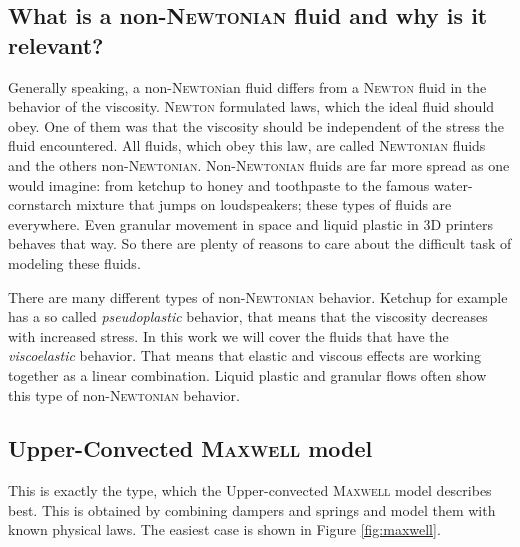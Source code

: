 \documentclass[12pt,a4paper,twoside, open=right]{scrreprt}
\theoremstyle{definition}
\theoremstyle{plain}
\begin{document}
\subsection{What is a non-\textsc{Newtonian} fluid and why is it relevant?}
Generally speaking, a non-\textsc{Newton}ian fluid differs from a \textsc{Newton} fluid in the behavior of the viscosity. \textsc{Newton} formulated laws, which the ideal fluid should obey. One of them was that the viscosity should be independent of the stress the fluid encountered. All fluids, which obey this law, are called \textsc{Newtonian} fluids and the others non-\textsc{Newtonian}. Non-\textsc{Newtonian} fluids are far more spread as one would imagine: from ketchup to honey and toothpaste to the famous water-cornstarch mixture that jumps on loudspeakers; these types of fluids are everywhere. Even granular movement in space and liquid plastic in 3D printers behaves that way. So there are plenty of reasons to care about the difficult task of modeling these fluids. \par 
There are many different types of non-\textsc{Newtonian} behavior. Ketchup for example has a so called \emph{pseudoplastic} behavior, that means that the viscosity decreases with increased stress. In this work we will cover the fluids that have the \emph{viscoelastic }behavior. That means that elastic and viscous effects are working together as a linear combination. Liquid plastic and granular flows often show this type of non-\textsc{Newtonian} behavior.
\subsection{Upper-Convected \textsc{Maxwell} model}
This is exactly the type, which the Upper-convected \textsc{Maxwell} model describes best. This is obtained by combining dampers and springs and model them with known physical laws. The easiest case is shown in Figure \ref{fig:maxwell}.
\end{document}
